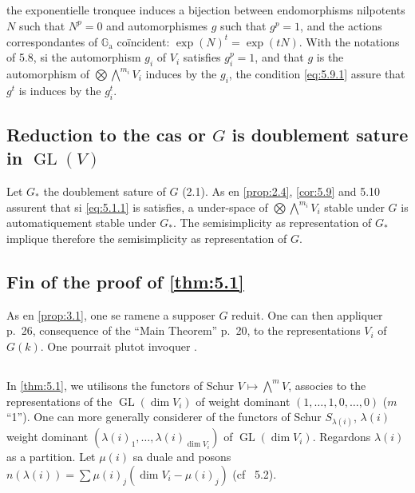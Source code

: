 \documentclass[11pt,a4paper]{article}
\theoremstyle{plain}
\theoremstyle{definition}
\DeclareMathOperator{\GL}{GL}
\newcommand{\Ga}{\mathbb{G}_\mathrm{a}}
\begin{document}
\subsection{}
the exponentielle tronquee induces a bijection between endomorphisms nilpotents $N$ such that $N^p = 0$ and automorphismes $g$ such that $g^p = 1$, and the actions correspondantes of $\Ga$ co\"incident: $\exp(N)^t = \exp(tN)$. With the notations of 5.8, si the automorphism $g_i$ of $V_i$ satisfies $g_i^p = 1$, and that $g$ is the automorphism of $\bigotimes \bigwedge^{m_i} V_i$ induces by the $g_i$, the condition \eqref{eq:5.9.1} assure that $g^t$ is induces by the $g_i^t$.

\subsection{Reduction to the cas or $G$ is doublement sature in $\GL(V)$}\label{sec:5.11}

Let $G_*$ the doublement sature of $G$ (2.1). As en \ref{prop:2.4}, \ref{cor:5.9} and 5.10 assurent that si \eqref{eq:5.1.1} is satisfies, a under-space of $\bigotimes \bigwedge^{m_i} V_i$ stable under $G$ is automatiquement stable under $G_*$. The semisimplicity as representation of $G_*$ implique therefore the semisimplicity as representation of $G$.

\subsection{Fin of the proof of \ref{thm:5.1}}\label{sec:5.12}

As en \ref{prop:3.1}, one se ramene a supposer $G$ reduit. One can then appliquer \cite{Serre2003} p.~26, consequence of the ``Main Theorem'' p.~20, to the representations $V_i$ of $G(k)$. One pourrait plutot invoquer \cite{SerreBourbaki}.

\subsection{}
In \ref{thm:5.1}, we utilisons the functors of Schur $V \mapsto \bigwedge^m V$, associes to the representations of the $\GL(\dim V_i)$ of weight dominant $(1, \ldots, 1, 0, \ldots, 0)$ ($m$ ``1''). One can more generally considerer of the functors of Schur $S_{\lambda(i)}$, $\lambda(i)$ weight dominant $(\lambda(i)_1, \ldots, \lambda(i)_{\dim V_i})$ of $\GL(\dim V_i)$. Regardons $\lambda(i)$ as a partition. Let $\mu(i)$ sa duale and posons $n(\lambda(i)) = \sum \mu(i)_j (\dim V_i - \mu(i)_j)$ (cf \cite{SerreBourbaki}~5.2).
\end{document}
